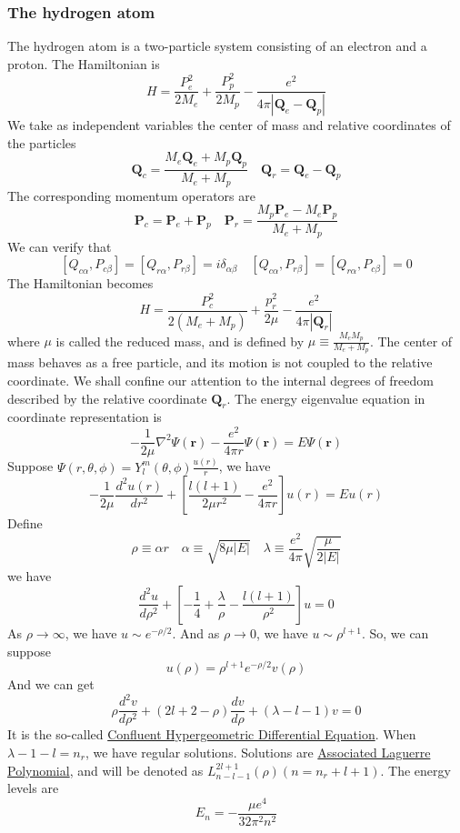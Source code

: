 \documentclass[cyan]{elegantnote}
\begin{document}
\subsubsection{The hydrogen atom}
The hydrogen atom is a two-particle system consisting of an electron and a proton. The Hamiltonian is
\[H = \frac{P_e^2}{2M_e} + \frac{P_p^2}{2M_p} - \frac{e^2}{4\pi|\bm{Q}_e-\bm{Q}_p|}\]
We take as independent variables the center of mass and relative coordinates of the particles
\[\bm{Q}_c = \frac{M_e\bm{Q}_e + M_p\bm{Q}_p}{M_e+M_p} \quad \bm{Q}_r = \bm{Q}_e-\bm{Q}_p\]
The corresponding momentum operators are
\[\bm{P}_c = \bm{P}_e + \bm{P}_p \quad \bm{P}_r = \frac{M_p\bm{P}_e-M_e\bm{P}_p}{M_e + M_p}\]
We can verify that
\[[Q_{c\alpha},P_{c\beta}] = [Q_{r\alpha},P_{r\beta}] = i\delta_{\alpha\beta} \quad [Q_{c\alpha},P_{r\beta}] = [Q_{r\alpha},P_{c\beta}] = 0\]
The Hamiltonian becomes
\[H = \frac{P_c^2}{2(M_e+M_p)} + \frac{p_r^2}{2\mu} - \frac{e^2}{4\pi|\bm{Q}_r|}\]
where $\mu$ is called the reduced mass, and is defined by $\mu \equiv \frac{M_eM_p}{M_e+M_p}$.
The center of mass behaves as a free particle, and its
motion is not coupled to the relative coordinate. We shall confine our attention to the internal degrees of freedom described by the relative coordinate $\bm{Q}_r$. The energy eigenvalue equation in coordinate representation is
\[-\frac{1}{2\mu}\nabla^2 \Psi(\bm{r})  -\frac{e^2}{4\pi r} \Psi(\bm{r}) = E\Psi(\bm{r})\]
Suppose $\Psi(r,\theta,\phi) = Y_l^m(\theta,\phi) \frac{u(r)}{r}$, we have
\[-\frac{1}{2\mu} \frac{d^2 u(r)}{dr^2} + \left[ \frac{l(l+1)}{2\mu r^2} - \frac{e^2}{4\pi r}\right]u(r) = Eu(r)\]
Define
\[\rho \equiv \alpha r \quad \alpha \equiv \sqrt{8\mu|E|} \quad \lambda \equiv \frac{e^2}{4\pi} \sqrt{\frac{\mu}{2|E|}}\]
we have
\[\frac{d^2 u}{d\rho^2} + \left[ -\frac{1}{4} + \frac{\lambda}{\rho} - \frac{l(l+1)}{\rho^2} \right] u = 0\]
As $\rho \to \infty$, we have $u \sim e^{-\rho/2}$. And as $\rho \to 0$, we have $u \sim \rho^{l+1}$. So, we can suppose
\[u(\rho) = \rho^{l+1} e^{-\rho/2} v(\rho)\]
And we can get
\[\rho \frac{d^2 v}{d\rho^2} + (2l+2-\rho)\frac{dv}{d\rho} + (\lambda-l-1)v = 0\]
It is the so-called \href{http://mathworld.wolfram.com/ConfluentHypergeometricDifferentialEquation.html}{Confluent Hypergeometric Differential Equation}.
When $\lambda - 1- l = n_r$, we have regular solutions. Solutions are \href{https://en.wikipedia.org/wiki/Laguerre_polynomials#Generalized_Laguerre_polynomials}{Associated Laguerre Polynomial}, and will be denoted as $L_{n-l-1}^{2l+1}(\rho) (n=n_r+l+1)$. The energy levels are
\[E_n = -\frac{\mu e^4}{32\pi^2 n^2}\]
\end{document}
